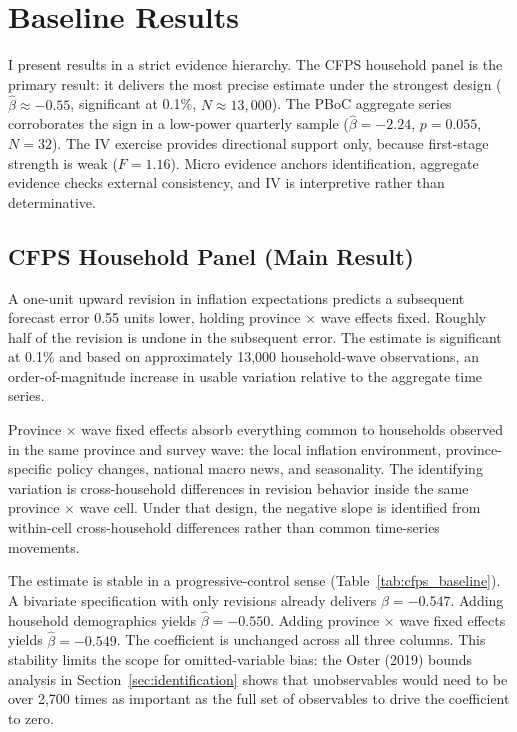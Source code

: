 \section{Baseline Results}\label{sec:results}

I present results in a strict evidence hierarchy. The CFPS household
panel is the primary result: it delivers the most precise estimate under
the strongest design ($\hat{\beta} \approx -0.55$, significant at 0.1\%,
$N \approx 13{,}000$). The PBoC aggregate series corroborates the sign
in a low-power quarterly sample ($\hat{\beta} = -2.24$, $p = 0.055$,
$N = 32$). The IV exercise provides directional support only, because
first-stage strength is weak ($F = 1.16$). Micro evidence anchors
identification, aggregate evidence checks external consistency, and IV
is interpretive rather than determinative.

\subsection{CFPS Household Panel (Main Result)}
\label{sec:cfps_main_result}

A one-unit upward revision in inflation expectations predicts a
subsequent forecast error 0.55 units lower, holding province $\times$
wave effects fixed. Roughly half of the revision is undone in the
subsequent error. The estimate is significant at 0.1\% and based on
approximately 13,000 household-wave observations, an
order-of-magnitude increase in usable variation relative to the
aggregate time series.

Province $\times$ wave fixed effects absorb everything common to
households observed in the same province and survey wave: the local
inflation environment, province-specific policy changes, national macro
news, and seasonality. The identifying variation is cross-household
differences in revision behavior inside the same province $\times$ wave
cell. Under that design, the negative slope is identified from within-cell
cross-household differences rather than common time-series movements.

The estimate is stable in a progressive-control sense
(Table~\ref{tab:cfps_baseline}). A bivariate specification with only
revisions already delivers $\hat{\beta} = -0.547$. Adding household
demographics yields $\hat{\beta} = -0.550$. Adding province $\times$
wave fixed effects yields $\hat{\beta} = -0.549$. The coefficient is
unchanged across all three columns. This stability limits the scope for
omitted-variable bias: the Oster (2019) bounds analysis in
Section~\ref{sec:identification} shows that unobservables would need to
be over 2,700 times as important as the full set of observables to
drive the coefficient to zero.

